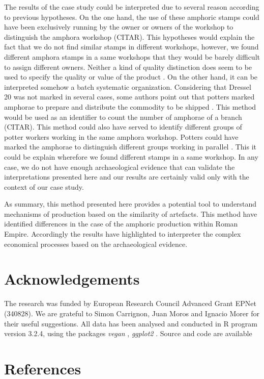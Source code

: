 \documentclass[review]{elsarticle}
\begin{document}
The results of the case study could be interpreted due to several reason according to previous hypotheses. On the one hand, the use of these amphoric stamps could have been exclusively running by the owner or owners of the workshop to distinguish the amphora workshop (CITAR). This hypotheses would explain the fact that we do not find similar stamps in different workshops, however, we found different amphora stamps in a same workshops that they would be barely difficult to assign different owners. Neither a kind of quality distinction does seem to be used to specify the quality or value of the product \citep{callender}. On the other hand, it can be interpreted somehow a batch systematic organization. Considering that Dressel 20 was not marked in several cases, some authors point out that potters marked amphorae to prepare and distribute the commodity to be shipped \citep{berni_millet_epigrafianforica_2008}. This method would be used as an identifier to count the number of amphorae of a branch (CITAR). This method could also have served to identify different groups of potter workers working in the same amphora workshop. Potters could have marked the amphorae to distinguish  different groups working in parallel \citep{li_crossbows_2014}. This it could be explain wherefore we found different stamps in a same workshop. 
In any case, we do not have enough archaeological evidence that can validate the interpretations presented here and our results are certainly valid only with the context of our case study. 

As summary, this method presented here provides a potential tool to understand mechanisms of production based on the similarity of artefacts. This method have identified differences in the case of the amphoric production within Roman Empire. Accordingly the results have highlighted to interpreter the complex economical processes based on the archaeological evidence. 



\section{Acknowledgements}

The research was funded by European Research Council Advanced Grant EPNet (340828). We are grateful to Simon Carrignon, Juan Moros and Ignacio Morer for their useful suggestions.  
All data has been analysed and conducted in R program version 3.2.4, using the packages \textit{vegan} \citep{oksanen_vegan_2007}, \textit{ggplot2} \citep{ggplot2:_2016}. Source and code are available 


\section{References}


\end{document}
